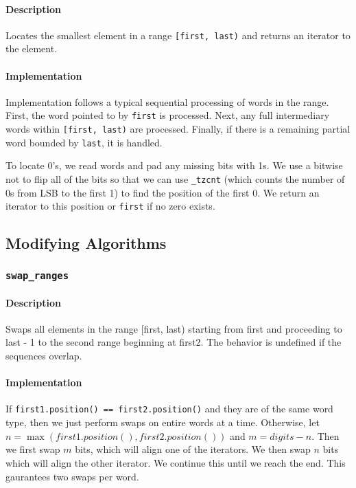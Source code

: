 \documentclass[letterpaper, 8pt, twocolumn]{article}
\begin{document}
\paragraph{Description}
Locates the smallest element in a range \texttt{[first, last)} and returns an 
iterator to the element.

\paragraph{Implementation}
Implementation follows a typical sequential processing of words in the range. 
First, the word pointed to by \texttt{first} is processed. Next, any full 
intermediary words within \texttt{[first, last)} are processed. Finally, if 
there is a remaining partial word bounded by \texttt{last}, it is handled.

To locate 0's, we read words and pad any missing bits with 1s. We use a 
bitwise not to flip all of the bits so that we can use \texttt{\_tzcnt} 
(which counts the number of 0s from LSB to the first 1) to find the position of 
the first 0. We return an iterator to this position or \texttt{first} if no zero 
exists.


\subsection{Modifying Algorithms}
\label{subsec:modifyingAlgs}

\subsubsection{\texttt{swap_ranges}}
\label{subsubsec:swap_ranges}
\paragraph{Description}
Swaps all elements in the range [first, last) starting from first and 
proceeding to last - 1 to the second range beginning at first2. 
The behavior is undefined if the sequences overlap.

\paragraph{Implementation}
    If \texttt{first1.position() == first2.position()} and they are of the same
    word type, then we just perform swaps on entire words at a time. Otherwise,
    let $n=\max(first1.position(), first2.position())$ and
    $m = digits - n$. Then we first swap $m$ bits, which will align one of the
    iterators. We then swap $n$ bits which will align the other iterator. We 
    continue this until we reach the end. This gaurantees two swaps per word.
\end{document}

